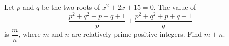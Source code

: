 Let $p$ and $q$ be the two roots of $x^2+2x+15=0$. The value of
\[\dfrac{p^2+q^2+p+q+1}{p}+\dfrac{p^2+q^2+p+q+1}{q}\]
is $\dfrac mn$, where $m$ and $n$ are relatively prime positive integers. Find $m+n$.
